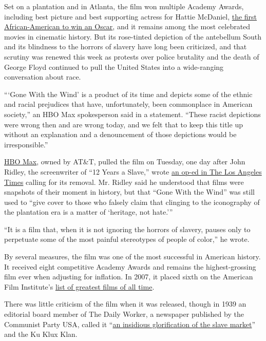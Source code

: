 Set on a plantation and in Atlanta, the film won multiple Academy
Awards, including best picture and best supporting actress for Hattie
McDaniel,
\href{https://www.hollywoodreporter.com/features/oscars-first-black-winner-accepted-774335}{the
first African-American to win an Oscar}, and it remains among the most
celebrated movies in cinematic history. But its rose-tinted depiction of
the antebellum South and its blindness to the horrors of slavery have
long been criticized, and that scrutiny was renewed this week as
protests over police brutality and the death of George Floyd continued
to pull the United States into a wide-ranging conversation about race.

```Gone With the Wind' is a product of its time and depicts some of the
ethnic and racial prejudices that have, unfortunately, been commonplace
in American society,'' an HBO Max spokesperson said in a statement.
``These racist depictions were wrong then and are wrong today, and we
felt that to keep this title up without an explanation and a
denouncement of those depictions would be irresponsible.''

\href{https://www.nytimes3xbfgragh.onion/2020/05/26/business/media/hbo-max-netflix-streaming.html}{HBO
Max}, owned by AT\&T, pulled the film on Tuesday, one day after John
Ridley, the screenwriter of ``12 Years a Slave,'' wrote
\href{https://www.latimes.com/opinion/story/2020-06-08/hbo-max-racism-gone-with-the-wind-movie}{an
op-ed in The Los Angeles Times} calling for its removal. Mr. Ridley said
he understood that films were snapshots of their moment in history, but
that ``Gone With the Wind'' was still used to ``give cover to those who
falsely claim that clinging to the iconography of the plantation era is
a matter of `heritage, not hate.'''

``It is a film that, when it is not ignoring the horrors of slavery,
pauses only to perpetuate some of the most painful stereotypes of people
of color,'' he wrote.

By several measures, the film was one of the most successful in American
history. It received eight competitive Academy Awards and remains the
highest-grossing film ever when adjusting for inflation. In 2007, it
placed sixth on the American Film Institute's
\href{https://www.afi.com/afis-100-years-100-movies-10th-anniversary-edition/}{list
of greatest films of all time}.

There was little criticism of the film when it was released, though in
1939 an editorial board member of The Daily Worker, a newspaper
published by the Communist Party USA, called it
``\href{https://www.nytimes3xbfgragh.onion/1939/12/24/archives/red-paper-condemns-gone-with-the-wind-terms-the-film-a.html}{an
insidious glorification of the slave market}'' and the Ku Klux Klan.


